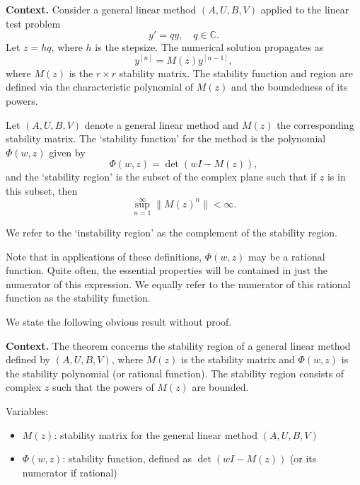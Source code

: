 \noindent\textbf{Context.}
Consider a general linear method $(A, U, B, V)$ applied to the linear test problem
\begin{equation}
    y' = qy, \quad q \in \mathbb{C}. \tag{520a}
\end{equation}
Let $z = hq$, where $h$ is the stepsize. The numerical solution propagates as
\begin{equation}
    y^{[n]} = M(z) y^{[n-1]}, \tag{520b}
\end{equation}
where $M(z)$ is the $r \times r$ stability matrix. The stability function and region are defined via the characteristic polynomial of $M(z)$ and the boundedness of its powers.

\begin{definition}

  \label{def:520C}
Let $(A, U, B, V)$ denote a general linear method and $M(z)$ the corresponding stability matrix. The `stability function' for the method is the polynomial $\Phi(w, z)$ given by
\[
\Phi(w, z) = \det(wI - M(z)),
\]
and the `stability region' is the subset of the complex plane such that if $z$ is in this subset, then
\[
\sup_{n=1}^{\infty} \| M(z)^n \| < \infty.
\]

We refer to the `instability region' as the complement of the stability region.

Note that in applications of these definitions, $\Phi(w, z)$ may be a rational function. Quite often, the essential properties will be contained in just the numerator of this expression. We equally refer to the numerator of this rational function as the stability function.

We state the following obvious result without proof.
\end{definition}

\noindent\textbf{Context.}
The theorem concerns the stability region of a general linear method defined by $(A, U, B, V)$, where $M(z)$ is the stability matrix and $\Phi(w, z)$ is the stability polynomial (or rational function). The stability region consists of complex $z$ such that the powers of $M(z)$ are bounded.

Variables:
\begin{itemize}
    \item $M(z)$: stability matrix for the general linear method $(A, U, B, V)$
    \item $\Phi(w, z)$: stability function, defined as $\det(wI - M(z))$ (or its numerator if rational)
\end{itemize}

